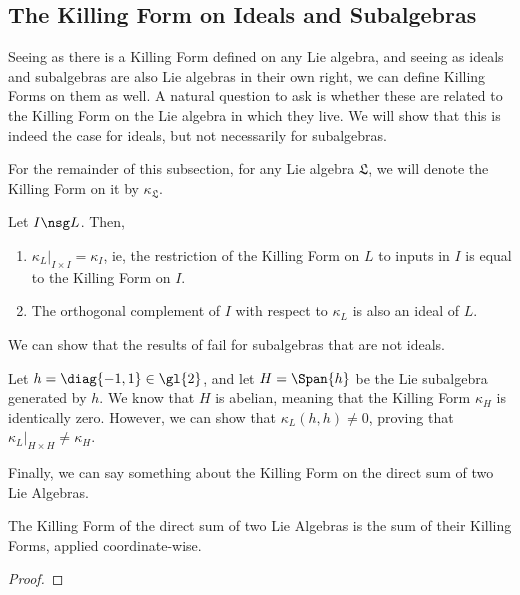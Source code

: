 \subsection{The Killing Form on Ideals and Subalgebras}

Seeing as there is a Killing Form defined on any Lie algebra, and seeing as ideals and subalgebras are also Lie algebras in their own right, we can define Killing Forms on them as well. A natural question to ask is whether these are related to the Killing Form on the Lie algebra in which they live. We will show that this is indeed the case for ideals, but not necessarily for subalgebras.

For the remainder of this subsection, for any Lie algebra $\mathfrak{L}$, we will denote the Killing Form on it by $\kappa_{\mathfrak{L}}$.

\begin{boxproposition}\label{Ch2:Prop:KillingIdeal}
    Let $I \nsg L$. Then,
    \begin{enumerate}[label = \normalfont \arabic*.]
        \item $\kappa_L\vert_{I \times I} = \kappa_{I}$, ie, the restriction of the Killing Form on $L$ to inputs in $I$ is equal to the Killing Form on $I$.
        \item The orthogonal complement of $I$ with respect to $\kappa_L$ is also an ideal of $L$.
    \end{enumerate}
\end{boxproposition}

We can show that the results of  fail for subalgebras that are not ideals.

\begin{boxcexample}
    Let $h = \diag{-1, 1} \in \gl{2}$, and let $H = \Span{h}$ be the Lie subalgebra generated by $h$. We know that $H$ is abelian, meaning that the Killing Form $\kappa_H$ is identically zero. However, we can show that $\kappa_L(h, h) \neq 0$, proving that $\kappa_L\vert_{H \times H} \neq \kappa_H$.
\end{boxcexample}

Finally, we can say something about the Killing Form on the direct sum of two Lie Algebras.

\begin{boxproposition}
    The Killing Form of the direct sum of two Lie Algebras is the sum of their Killing Forms, applied coordinate-wise.
\end{boxproposition}
\begin{proof}
    \sorry
\end{proof}
